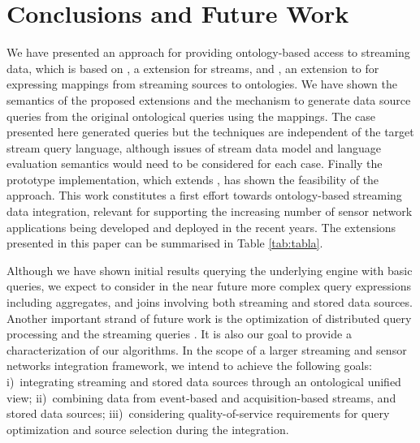 \section{Conclusions and Future Work}
\label{conclusions}

We have presented an approach for providing ontology-based access to streaming data, which is based on \sparqlstr, a
\sparql extension for \rdf streams, and \stwoo, an extension to \rtwoo for expressing mappings from streaming sources
to ontologies. We have shown the semantics of the proposed extensions and the mechanism to generate data source queries
from the original ontological queries using the mappings. The case presented here generated \sneeql queries but the
techniques are independent of the target stream query language, although issues of stream data model and language
evaluation semantics would need to be considered for each case. Finally the prototype implementation, which extends
\odemapster, has shown the feasibility of the approach. This work constitutes a first effort towards ontology-based
streaming data integration, relevant for supporting the increasing number of sensor network applications being
developed and deployed in the recent years. The extensions presented in this paper can be summarised in Table
\ref{tab:tabla}.


Although we have shown initial results querying the underlying \snee engine with basic queries, we expect to consider in the near future more complex query expressions including aggregates, and joins involving both streaming and stored data sources.
Another important strand of future work is the optimization of distributed query processing \cite{Kossmann_00} and the streaming queries \cite{Abadi_2005,Galpin_09}.
It is also our goal to provide a characterization of our algorithms. 
In the scope of a larger streaming and sensor networks integration framework, we intend to achieve the following goals: %
i)~integrating streaming and stored data sources through an ontological unified view; %
ii)~combining data from event-based and acquisition-based streams, and stored data sources; %
iii)~considering quality-of-service requirements for query optimization and source selection during the integration.

